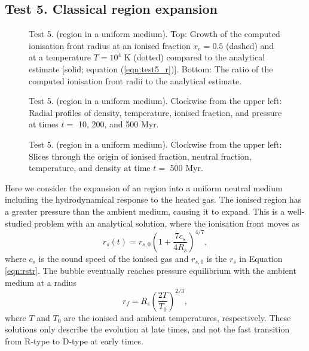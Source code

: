 \documentclass[useAMS,usenatbib]{mn2e}
\begin{document}
\subsection{Test 5. Classical \hii region expansion}
\label{sec:test5}

\begin{figure}
  \caption{\label{fig:test5_1} Test 5. (\hii region in a uniform
    medium).  Top: Growth of the computed ionisation front radius at
    an ionised fraction $x_e = 0.5$ (dashed) and at a temperature $T =
    10^4$ K (dotted) compared to the analytical estimate [solid;
    equation (\ref{eqn:test5_r})].  Bottom: The ratio of the computed
    ionisation front radii to the analytical estimate.} 
\end{figure}

\begin{figure}
  \caption{\label{fig:test5_2} Test 5. (\hii region in a uniform
    medium).  Clockwise from the upper left: Radial profiles of
    density, temperature, ionised fraction, and pressure at times $t
    =$ 10, 200, and 500 Myr.}
\end{figure}

\begin{figure*}
  \caption{\label{fig:test5_3} Test 5. (\hii region in a uniform
    medium).  Clockwise from the upper left: Slices through the origin
    of ionised fraction, neutral fraction, temperature, and density at
    time $t =$ 500 Myr.}
\end{figure*}

Here we consider the expansion of an \hii region into a uniform
neutral medium including the hydrodynamical response to the heated
gas.  The ionised region has a greater pressure than the ambient
medium, causing it to expand.  This is a well-studied problem
\citep{Spitzer78} with an analytical solution, where the ionisation
front moves as
%
\begin{equation}
  \label{eqn:test5_r}
  r_s(t) = r_{s,0} \left(1 + \frac{7c_s}{4R_s}\right)^{4/7},
\end{equation}
where $c_s$ is the sound speed of the ionised gas and $r_{s,0}$ is the
$r_s$ in Equation \ref{eqn:rstr}.  The bubble eventually reaches
pressure equilibrium with the ambient medium at a radius
%
\begin{equation}
  \label{eqn:test5_final}
  r_f = R_s \left(\frac{2T}{T_0}\right)^{2/3},
\end{equation}
where $T$ and $T_0$ are the ionised and ambient temperatures,
respectively.  These solutions only describe the evolution at late
times, and not the fast transition from R-type to D-type at early
times.
\end{document}
